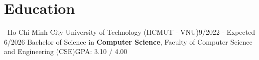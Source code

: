 \section{Education}
    \resumeSubHeadingListStart

    \resumeSubheading
    {\vspace{0.1cm}  \ Ho Chi Minh City University of Technology (HCMUT - VNU)}{9/2022 - Expected 6/2026}
    {Bachelor of Science in \textbf{Computer Science}, Faculty of Computer Science and Engineering (CSE)}{GPA: 3.10 / 4.00}

    \resumeSubHeadingListEnd
